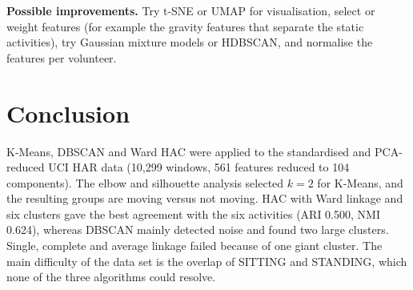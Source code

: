 \documentclass[12pt,a4paper]{article}
\begin{document}
\textbf{Possible improvements.} Try t-SNE or UMAP for visualisation, select or weight features (for example the gravity features that separate the static activities), try Gaussian mixture models or HDBSCAN, and normalise the features per volunteer.

\section{Conclusion}
K-Means, DBSCAN and Ward HAC were applied to the standardised and PCA-reduced UCI HAR data (10,299 windows, 561 features reduced to 104 components). The elbow and silhouette analysis selected $k=2$ for K-Means, and the resulting groups are moving versus not moving. HAC with Ward linkage and six clusters gave the best agreement with the six activities (ARI 0.500, NMI 0.624), whereas DBSCAN mainly detected noise and found two large clusters. Single, complete and average linkage failed because of one giant cluster. The main difficulty of the data set is the overlap of SITTING and STANDING, which none of the three algorithms could resolve.

\end{document}
